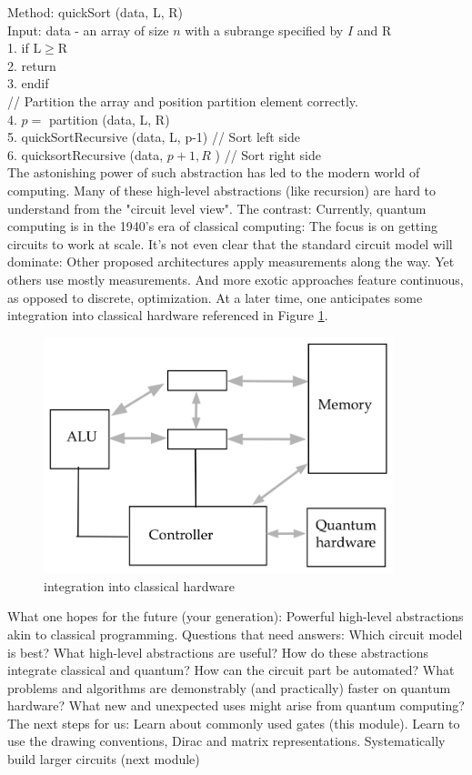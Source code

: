 \documentclass[main.tex]{subfiles}
\begin{document}
    Method: quickSort (data, L, R)\\
    Input: data - an array of size $n$ with a subrange specified by $I$ and R\\
    1. if $\mathrm{L} \geq \mathrm{R}$\\
    2. return \\
    3. endif \\
    // Partition the array and position partition element correctly.\\
    4. $p=$ partition (data, L, R) \\
    5. quickSortRecursive (data, L, p-1) // Sort left side \\
    6. quicksortRecursive (data, $p+1, R$ ) // Sort right side \\
    
    The astonishing power of such abstraction has led to the modern world of computing. Many of these high-level abstractions (like recursion) are hard to understand from the "circuit level view". The contrast: Currently, quantum computing is in the 1940's era of classical computing: The focus is on getting circuits to work at scale. It's not even clear that the standard circuit model will dominate: Other proposed architectures apply measurements along the way. Yet others use mostly measurements. And more exotic approaches feature continuous, as opposed to discrete, optimization. At a later time, one anticipates some integration into classical hardware referenced in Figure \ref{fig:04program2}.
    
    \begin{figure}
        \centering
        \includegraphics[width=4in]{notes/figs/n08/04program2.png}
        \caption{integration into classical hardware}
        \label{fig:04program2}
    \end{figure}
    
    What one hopes for the future (your generation): Powerful high-level abstractions akin to classical programming. Questions that need answers: Which circuit model is best? What high-level abstractions are useful? How do these abstractions integrate classical and quantum? How can the circuit part be automated? What problems and algorithms are demonstrably (and practically) faster on quantum hardware? What new and unexpected uses might arise from quantum computing? The next steps for us: Learn about commonly used gates (this module). Learn to use the drawing conventions, Dirac and matrix representations. Systematically build larger circuits (next module)
\end{document}
